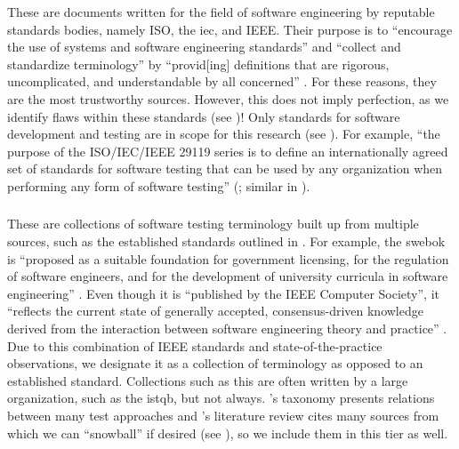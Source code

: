 These are documents written for the field of software engineering by reputable
standards bodies, namely ISO, the \acf{iec}, and IEEE. Their purpose is to
``encourage the use of systems and software engineering standards'' and
``collect and standardize terminology'' by ``provid[ing] definitions that are
rigorous, uncomplicated, and understandable by all concerned''
\citep[p.~viii]{IEEE2017}. For these reasons, they
are the most trustworthy sources. However, this does not imply perfection, as we
identify  %
flaws within these standards (see )!
Only standards for software development and testing are in scope for
this research (see ). For example, ``the purpose of the
ISO/IEC/IEEE 29119 series is to define an internationally agreed set of
standards for software testing that can be used by any organization when
performing any form of software testing''
\ifnotpaper(\fi\citeyear[p.~vii]{IEEE2022}\ifnotpaper; similar in
\citeyear[p.~ix]{IEEE2016})\fi.

\subsubsection{}
\label{metas}

These are collections of software testing terminology built up from multiple
sources, such as the established standards outlined in . For
example, the \acs{swebok} is ``proposed as a
suitable foundation for government licensing, for the regulation of software
engineers, and for the development of university curricula in software
engineering'' \citep[p.~xix]{KanerEtAl2011}. Even though it is ``published by
the IEEE Computer Society'', it ``reflects the current state of generally
accepted, consensus-driven knowledge derived from the interaction between
software engineering theory and practice'' \citep{AboutSWEBOK}. Due to this
combination of IEEE standards and state-of-the-practice observations, we
designate it as a collection of terminology as opposed to an established
standard. Collections such as this are often written by a large
organization, such as the \acf{istqb}, but not always. \ifnotpaper \else
    \citeauthor{Firesmith2015} \fi \citet{Firesmith2015}'s taxonomy presents
relations between many test approaches and \ifnotpaper \else
    \citeauthor{DoğanEtAl2014} \fi \citet{DoğanEtAl2014}'s literature
review cites many sources from which we can ``snowball'' if desired
(see ), so we include them in this tier as well.

